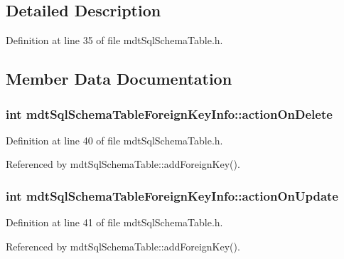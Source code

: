 \subsection{Detailed Description}


Definition at line 35 of file mdt\-Sql\-Schema\-Table.\-h.



\subsection{Member Data Documentation}
\hypertarget{structmdt_sql_schema_table_foreign_key_info_a0c653ac4f2e5fdfe9dce56bfb4f09ee5}{
\subsubsection[{action\-On\-Delete}]{\setlength{\rightskip}{0pt plus 5cm}int mdt\-Sql\-Schema\-Table\-Foreign\-Key\-Info\-::action\-On\-Delete}}\label{structmdt_sql_schema_table_foreign_key_info_a0c653ac4f2e5fdfe9dce56bfb4f09ee5}


Definition at line 40 of file mdt\-Sql\-Schema\-Table.\-h.



Referenced by mdt\-Sql\-Schema\-Table\-::add\-Foreign\-Key().

\hypertarget{structmdt_sql_schema_table_foreign_key_info_ae43338084ff992252607f38078053475}{
\subsubsection[{action\-On\-Update}]{\setlength{\rightskip}{0pt plus 5cm}int mdt\-Sql\-Schema\-Table\-Foreign\-Key\-Info\-::action\-On\-Update}}\label{structmdt_sql_schema_table_foreign_key_info_ae43338084ff992252607f38078053475}


Definition at line 41 of file mdt\-Sql\-Schema\-Table.\-h.



Referenced by mdt\-Sql\-Schema\-Table\-::add\-Foreign\-Key().

